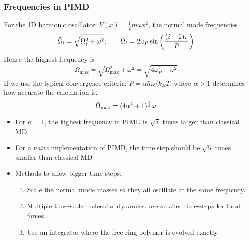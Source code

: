 \begin{frame}
  \frametitle{Frequencies in PIMD}

  For the 1D harmonic oscillator: $V(x) = \frac{1}{2}m\omega x^2$, 
  the normal mode frequencies
  \begin{equation*}
    \tilde{\Omega}_i = \sqrt{\Omega_i^2 + \omega^2};\qquad \Omega_i = 2\omega_P \sin\left({(i-1)\pi\over P}\right)
  \end{equation*}
  Hence the highest frequency is
  \begin{equation*}
    \tilde{\Omega}_{\text{max}} = \sqrt{\Omega_{\text{max}}^2 + \omega^2} =
    \sqrt{4\omega_P^2 + \omega^2}
  \end{equation*}
  If we use the typical convergence criteria: $P = \alpha\hbar\omega / k_BT$,
  where $\alpha > 1$ determines how accurate the calculation is.
  \begin{equation*}
    \tilde{\Omega}_{\text{max}} = (4\alpha^2 + 1)^{1\over2}\omega
  \end{equation*}

  \begin{multicols}{2}
    \begin{itemize}
    \item For $\alpha = 1$, the highest frequency in PIMD is $\sqrt{5}$ times larger
      than classical MD.
    \item For a \emph{naive} implementation of PIMD, the time step should be $\sqrt{5}$ times
      smaller than classical MD.
    \vfill\null
    \columnbreak
    \item Methods to allow bigger time-steps:
      \begin{enumerate}
      \item  Scale the normal mode masses so they all oscillate at the same
        frequency.
      \item Multiple time-scale molecular dynamics: use smaller time-steps for
        bead forces.
      \item Use an integrator where the free ring polymer is evolved exactly.
      \end{enumerate}

    \end{itemize}
    
  \end{multicols}
\end{frame}
